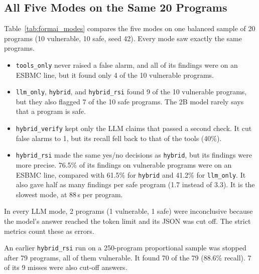 \documentclass[conference]{IEEEtran}
\begin{document}
\subsection{All Five Modes on the Same 20 Programs}
Table~\ref{tab:formai_modes} compares the five modes on one balanced sample of 20
programs (10 vulnerable, 10 safe, seed 42). Every mode saw exactly the same
programs.

\begin{itemize}
  \item \texttt{tools\_only} never raised a false alarm, and all of its findings
        were on an ESBMC line, but it found only 4 of the 10 vulnerable programs.
  \item \texttt{llm\_only}, \texttt{hybrid}, and \texttt{hybrid\_rsi} found 9 of
        the 10 vulnerable programs, but they also flagged 7 of the 10 safe
        programs. The 2B model rarely says that a program is safe.
  \item \texttt{hybrid\_verify} kept only the LLM claims that passed a second
        check. It cut false alarms to 1, but its recall fell back to that of the
        tools (40\%).
  \item \texttt{hybrid\_rsi} made the same yes/no decisions as \texttt{hybrid},
        but its findings were more precise. 76.5\% of its findings on vulnerable
        programs were on an ESBMC line, compared with 61.5\% for \texttt{hybrid}
        and 41.2\% for \texttt{llm\_only}. It also gave half as many findings per
        safe program (1.7 instead of 3.3). It is the slowest mode, at 88\,s per
        program.
\end{itemize}

In every LLM mode, 2 programs (1 vulnerable, 1 safe) were inconclusive because
the model's answer reached the token limit and its JSON was cut off. The strict
metrics count these as errors.

An earlier \texttt{hybrid\_rsi} run on a 250-program proportional sample was
stopped after 79 programs, all of them vulnerable. It found 70 of the 79 (88.6\%
recall). 7 of its 9 misses were also cut-off answers.
\end{document}
